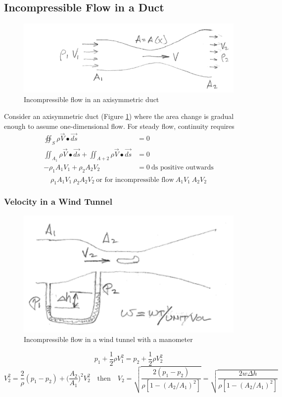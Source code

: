 \documentclass[draft=false, titlepage]{article}
\begin{document}
\subsection{Incompressible Flow in a Duct}
\begin{figure}[ht]
    \centering
    \includegraphics[width=0.5\linewidth]{Figures/flowInDuct.PNG}
    \caption{Incompressible flow in an axisymmetric duct}
    \label{fig:flowInDuct}
\end{figure}

Consider an axisymmetric duct (Figure \ref{fig:flowInDuct}) where the area change is gradual enough to assume one-dimensional flow. For steady flow, continuity requires
\begin{align*}
    \oiint_S \rho \vec{V} \bullet \vec{ds} &= 0\\
    \iint_{A_1} \rho \vec{V} \bullet \vec{ds} + \iint_{A+2} \rho \vec{V} \bullet \vec{ds} &= 0\\
    -\rho_1 A_1 V_1 + \rho_2 A_2 V_2 &= 0\ \text{ds positive outwards} \\
\end{align*}
\begin{equation*}
    \rho_1 A_1 V_1 \ \rho_2 A_2 V_2\ \text{or for incompressible flow}\ A_1V_1 \ A_2V_2
\end{equation*}

\subsubsection{Velocity in a Wind Tunnel}
\begin{figure}[ht]
    \centering
    \includegraphics[width=0.5\linewidth]{Figures/flowInWindTunnel.PNG}
    \caption{Incompressible flow in a wind tunnel with a manometer}
    \label{fig:flowInWindTunnel}
\end{figure}
\begin{equation*}
    p_1 + \frac{1}{2}\rho V_1 ^2 = p_2 + \frac{1}{2}\rho V_2^2
\end{equation*}
\begin{equation*}
    V_2^2 = \frac{2}{\rho} (p_1-p_2) + \Big(\frac{A_2}{A_1}\Big)^2 V_2^2
    \quad \text{then} \quad
    V_2 = \sqrt{ \frac{2(p_1-p_2)}{\rho[1-(A_2/A_1)^2]} } =
    \sqrt{ \frac{2w\Delta h}{\rho[1-(A_2/A_1)^2]} }
\end{equation*}
\end{document}
